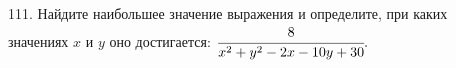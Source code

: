 111. Найдите наибольшее значение выражения и определите, при каких значениях $x$ и $y$ оно достигается: $\cfrac{8}{x^2+y^2-2x-10y+30}.$\\
